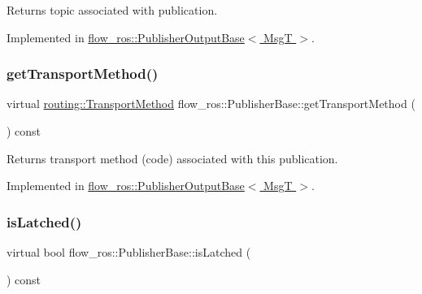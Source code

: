 Returns topic associated with publication. 



Implemented in \hyperlink{classflow__ros_1_1_publisher_output_base_a28d4636b7d52e0dac54f27556308e9d4}{flow\+\_\+ros\+::\+Publisher\+Output\+Base$<$ Msg\+T $>$}.

\mbox{\label{classflow__ros_1_1_publisher_base_ad0cd41b4d2a8e4697610643c7e90d8c7}} 
\subsubsection{\texorpdfstring{get\+Transport\+Method()}{getTransportMethod()}}
{\footnotesize\ttfamily virtual \hyperlink{transport__info_8h_ae57afcf849a5bdb82b958347c6ccc57b}{routing\+::\+Transport\+Method} flow\+\_\+ros\+::\+Publisher\+Base\+::get\+Transport\+Method (\begin{DoxyParamCaption}{ }\end{DoxyParamCaption}) const\hspace{0.3cm}{\ttfamily [pure virtual]}}



Returns transport method (code) associated with this publication. 



Implemented in \hyperlink{classflow__ros_1_1_publisher_output_base_ac052232bb5a6fb9ea04ab61453d14f69}{flow\+\_\+ros\+::\+Publisher\+Output\+Base$<$ Msg\+T $>$}.

\mbox{\label{classflow__ros_1_1_publisher_base_a51ef6d34734d3dc39053234491665d2c}} 
\subsubsection{\texorpdfstring{is\+Latched()}{isLatched()}}
{\footnotesize\ttfamily virtual bool flow\+\_\+ros\+::\+Publisher\+Base\+::is\+Latched (\begin{DoxyParamCaption}{ }\end{DoxyParamCaption}) const\hspace{0.3cm}{\ttfamily [pure virtual]}}



